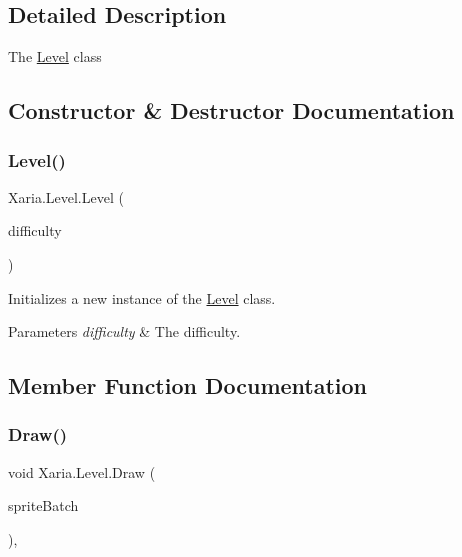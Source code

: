 \subsection{Detailed Description}
The \hyperlink{classXaria_1_1Level}{Level} class 



\subsection{Constructor \& Destructor Documentation}
\mbox{\label{classXaria_1_1Level_abbe8f5dc4eb2b1ea9bb259a4e1440838}} 
\subsubsection{\texorpdfstring{Level()}{Level()}}
{\footnotesize\ttfamily Xaria.\+Level.\+Level (\begin{DoxyParamCaption}\item[{int}]{difficulty }\end{DoxyParamCaption})\hspace{0.3cm}{\ttfamily [inline]}}



Initializes a new instance of the \hyperlink{classXaria_1_1Level}{Level} class. 


\begin{DoxyParams}{Parameters}
{\em difficulty} & The difficulty.\\
\hline
\end{DoxyParams}


\subsection{Member Function Documentation}
\mbox{\label{classXaria_1_1Level_a09298652a8048fff78f5497b08c51a16}} 
\subsubsection{\texorpdfstring{Draw()}{Draw()}}
{\footnotesize\ttfamily void Xaria.\+Level.\+Draw (\begin{DoxyParamCaption}\item[{ref Sprite\+Batch}]{sprite\+Batch }\end{DoxyParamCaption})\hspace{0.3cm}{\ttfamily [inline]}, {\ttfamily [package]}}



